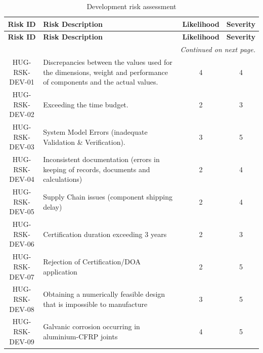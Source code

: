 \begin{longtable}{|c|p{9cm}|c|c|}
\caption{Development risk assessment}
\label{tab:development_risks} \\

\hline
\textbf{Risk ID} & \textbf{Risk Description} & \textbf{Likelihood} & \textbf{Severity} \\
\hline\hline
\endfirsthead

\hline
\textbf{Risk ID} & \textbf{Risk Description} & \textbf{Likelihood} & \textbf{Severity} \\
\hline\hline
\endhead

\hline
\multicolumn{4}{r}{\textit{Continued on next page.}} \\
\endfoot

\hline
\endlastfoot

HUG-RSK-DEV-01 & Discrepancies between the values used for the dimensions, weight and performance of components and the actual values. & 4 & 4 \\ \hline

HUG-RSK-DEV-02 & Exceeding the time budget. & 2 & 3 \\ \hline

HUG-RSK-DEV-03 & System Model Errors (inadequate Validation \& Verification). & 3 & 5 \\ \hline

HUG-RSK-DEV-04 & Inconsistent documentation (errors in keeping of records, documents and calculations) & 2 & 4 \\ \hline

HUG-RSK-DEV-05 & Supply Chain issues (component shipping delay) & 2 & 4 \\ \hline

HUG-RSK-DEV-06 & Certification duration exceeding 3 years & 2 & 3 \\ \hline

HUG-RSK-DEV-07 & Rejection of Certification/DOA application & 2 & 5 \\ \hline

HUG-RSK-DEV-08 & Obtaining a numerically feasible design that is impossible to manufacture & 3 & 5 \\ \hline

HUG-RSK-DEV-09 & Galvanic corrosion occurring in aluminium-CFRP joints & 4 & 5 \\ \hline

\end{longtable}

